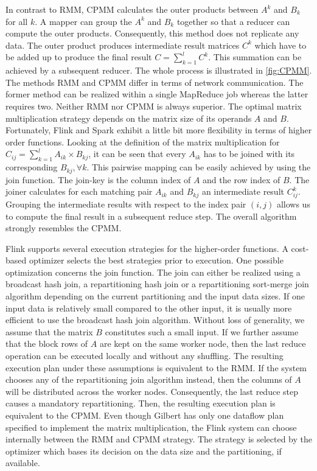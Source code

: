 In contrast to RMM, CPMM calculates the outer products between $A^k$ and $B_k$ for all $k$. A mapper can group the $A^k$ and $B_k$ together so that a reducer can compute the outer products. Consequently, this method does not replicate any data. The outer product produces intermediate result matrices $C^k$ which have to be added up to produce the final result $C=\sum_{k=1}^{l} C^k$. This summation can be achieved by a subsequent reducer. The whole process is illustrated in \cref{fig:CPMM}. The methods RMM and CPMM differ in terms of network communication. The former method can be realized within a single MapReduce job whereas the latter requires two. Neither RMM nor CPMM is always superior. The optimal matrix multiplication strategy depends on the matrix size of its operands $A$ and $B$. Fortunately, Flink and Spark exhibit a little bit more flexibility in terms of higher order functions. Looking at the definition of the matrix multiplication for $C_{ij}=\sum_{k=1}^{l}A_{ik}\times B_{kj}$, it can be seen that every $A_{ik}$ has to be joined with its corresponding $B_{kj},\forall k$. This pairwise mapping can be easily achieved by using the join function. The join-key is the column index of $A$ and the row index of $B$. The joiner calculates for each matching pair $A_{ik}$ and $B_{kj}$ an intermediate result $C_{ij}^k$. Grouping the intermediate results with respect to the index pair $(i,j)$ allows us to compute the final result in a subsequent reduce step. The overall algorithm strongly resembles the CPMM. 

Flink supports several execution strategies for the higher-order functions. 
A cost-based optimizer selects the best strategies prior to execution. 
One possible optimization concerns the join function. 
The join can either be realized using a broadcast hash join, a repartitioning hash join or a repartitioning sort-merge join algorithm depending on the current partitioning and the input data sizes. 
If one input data is relatively small compared to the other input, it is usually more efficient to use the broadcast hash join algorithm. 
Without loss of generality, we assume that the matrix $B$ constitutes such a small input. 
If we further assume that the block rows of $A$ are kept on the same worker node, then the last reduce operation can be executed locally and without any shuffling. 
The resulting execution plan under these assumptions is equivalent to the RMM. 
If the system chooses any of the repartitioning join algorithm instead, then the columns of $A$ will be distributed across the worker nodes. 
Consequently, the last reduce step causes a mandatory repartitioning. 
Then, the resulting execution plan is equivalent to the CPMM. 
Even though Gilbert has only one dataflow plan specified to implement the matrix multiplication, the Flink system can choose internally between the RMM and CPMM strategy. 
The strategy is selected by the optimizer which bases its decision on the data size and the partitioning, if available. %